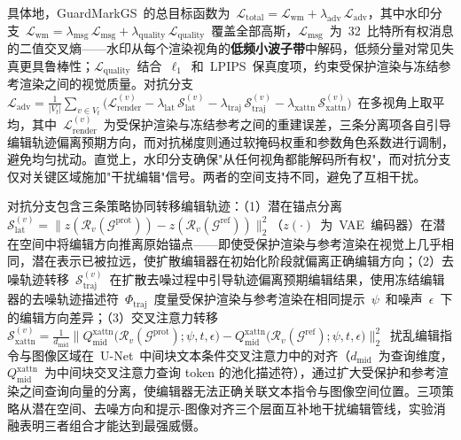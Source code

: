 具体地，GuardMarkGS~的总目标函数为~$\mathcal{L}_{\mathrm{total}} = \mathcal{L}_{\mathrm{wm}} + \lambda_{\mathrm{adv}}\,\mathcal{L}_{\mathrm{adv}}$，其中水印分支~$\mathcal{L}_{\mathrm{wm}} = \lambda_{\mathrm{msg}}\,\mathcal{L}_{\mathrm{msg}} + \lambda_{\mathrm{quality}}\,\mathcal{L}_{\mathrm{quality}}$~覆盖全部高斯，$\mathcal{L}_{\mathrm{msg}}$~为~32~比特所有权消息的二值交叉熵——水印从每个渲染视角的\textbf{低频小波子带}中解码，低频分量对常见失真更具鲁棒性；$\mathcal{L}_{\mathrm{quality}}$~结合~$\ell_1$~和~LPIPS~保真度项，约束受保护渲染与冻结参考渲染之间的视觉质量。对抗分支~$\mathcal{L}_{\mathrm{adv}} = \frac{1}{|V_t|}\sum_{v \in V_t}\!\big(\mathcal{L}_{\mathrm{render}}^{(v)} - \lambda_{\mathrm{lat}}\,\mathcal{S}_{\mathrm{lat}}^{(v)} - \lambda_{\mathrm{traj}}\,\mathcal{S}_{\mathrm{traj}}^{(v)} - \lambda_{\mathrm{xattn}}\,\mathcal{S}_{\mathrm{xattn}}^{(v)}\big)$~在多视角上取平均，其中~$\mathcal{L}_{\mathrm{render}}^{(v)}$~为受保护渲染与冻结参考之间的重建误差，三条分离项各自引导编辑轨迹偏离预期方向，而对抗梯度则通过软掩码权重和参数角色系数进行调制，避免均匀扰动。直觉上，水印分支确保"从任何视角都能解码所有权"，而对抗分支仅对关键区域施加"干扰编辑"信号。两者的空间支持不同，避免了互相干扰。

对抗分支包含三条策略协同转移编辑轨迹：（1）潜在锚点分离~$\mathcal{S}_{\mathrm{lat}}^{(v)} = \|z(\mathcal{R}_v(\mathcal{G}^{\mathrm{prot}})) - z(\mathcal{R}_v(\mathcal{G}^{\mathrm{ref}}))\|_2^2$（$z(\cdot)$~为~VAE~编码器）在潜在空间中将编辑方向推离原始锚点——即使受保护渲染与参考渲染在视觉上几乎相同，潜在表示已被拉远，使扩散编辑器在初始化阶段就偏离正确编辑方向；（2）去噪轨迹转移~$\mathcal{S}_{\mathrm{traj}}^{(v)}$~在扩散去噪过程中引导轨迹偏离预期编辑结果，使用冻结编辑器的去噪轨迹描述符~$\Phi_{\mathrm{traj}}$~度量受保护渲染与参考渲染在相同提示~$\psi$~和噪声~$\epsilon$~下的编辑方向差异；（3）交叉注意力转移~$\mathcal{S}_{\mathrm{xattn}}^{(v)} = \frac{1}{d_{\mathrm{mid}}}\big\|Q_{\mathrm{mid}}^{\mathrm{xattn}}\!\big(\mathcal{R}_v(\mathcal{G}^{\mathrm{prot}});\psi,t,\epsilon\big) - Q_{\mathrm{mid}}^{\mathrm{xattn}}\!\big(\mathcal{R}_v(\mathcal{G}^{\mathrm{ref}});\psi,t,\epsilon\big)\big\|_2^2$~扰乱编辑指令与图像区域在~U-Net~中间块文本条件交叉注意力中的对齐（$d_{\mathrm{mid}}$~为查询维度，$Q_{\mathrm{mid}}^{\mathrm{xattn}}$~为中间块交叉注意力查询 token 的池化描述符），通过扩大受保护和参考渲染之间查询向量的分离，使编辑器无法正确关联文本指令与图像空间位置。三项策略从潜在空间、去噪方向和提示-图像对齐三个层面互补地干扰编辑管线，实验消融表明三者组合才能达到最强威慑。

